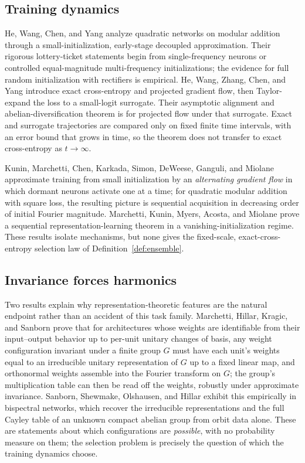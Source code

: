 \documentclass[11pt]{amsart}
\theoremstyle{plain}
\theoremstyle{definition}
\begin{document}
\subsection*{Training dynamics}
He, Wang, Chen, and Yang \cite{he2026grokking} analyze quadratic networks on modular addition through a small-initialization, early-stage decoupled approximation. Their rigorous lottery-ticket statements begin from single-frequency neurons or controlled equal-magnitude multi-frequency initializations; the evidence for full random initialization with rectifiers is empirical. He, Wang, Zhang, Chen, and Yang \cite{he2026spectral} introduce exact cross-entropy and projected gradient flow, then Taylor-expand the loss to a small-logit surrogate. Their asymptotic alignment and abelian-diversification theorem is for projected flow under that surrogate. Exact and surrogate trajectories are compared only on fixed finite time intervals, with an error bound that grows in time, so the theorem does not transfer to exact cross-entropy as $t\to\infty$.

Kunin, Marchetti, Chen, Karkada, Simon, DeWeese, Ganguli, and Miolane \cite{kunin2025} approximate training from small initialization by an \emph{alternating gradient flow} in which dormant neurons activate one at a time; for quadratic modular addition with square loss, the resulting picture is sequential acquisition in decreasing order of initial Fourier magnitude. Marchetti, Kunin, Myers, Acosta, and Miolane \cite{marchetti2026} prove a sequential representation-learning theorem in a vanishing-initialization regime. These results isolate mechanisms, but none gives the fixed-scale, exact-cross-entropy selection law of Definition~\ref{def:ensemble}.

\subsection*{Invariance forces harmonics}
Two results explain why representation-theoretic features are the natural endpoint rather than an accident of this task family. Marchetti, Hillar, Kragic, and Sanborn \cite{marchetti2024} prove that for architectures whose weights are identifiable from their input--output behavior up to per-unit unitary changes of basis, any weight configuration invariant under a finite group $G$ must have each unit's weights equal to an irreducible unitary representation of $G$ up to a fixed linear map, and orthonormal weights assemble into the Fourier transform on $G$; the group's multiplication table can then be read off the weights, robustly under approximate invariance. Sanborn, Shewmake, Olshausen, and Hillar \cite{sanborn2022} exhibit this empirically in bispectral networks, which recover the irreducible representations and the full Cayley table of an unknown compact abelian group from orbit data alone. These are statements about which configurations are \emph{possible}, with no probability measure on them; the selection problem is precisely the question of which the training dynamics choose.
\end{document}
